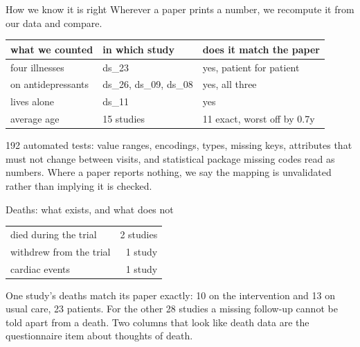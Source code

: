 \documentclass[11pt, t, handout]{beamer}
\newcommand{\ans}[1]{\textcolor{structure.fg}{#1}}
\begin{document}
\begin{frame}{How we know it is right}
  \pause
  Wherever a paper prints a number, we recompute it from our data and compare.
  \vspace{10pt}
  \pause
  \begin{center}\footnotesize
  \begin{tabular}{lll}
    \toprule
    what we counted & in which study & does it match the paper \\
    \midrule
    four illnesses & ds\_23 & \ans{yes, patient for patient} \\
    on antidepressants & ds\_26, ds\_09, ds\_08 & \ans{yes, all three} \\
    lives alone & ds\_11 & \ans{yes} \\
    average age & 15 studies & 11 exact, worst off by 0.7y \\
    \bottomrule
  \end{tabular}
  \end{center}
  \vspace{10pt}
  \pause
  \ans{192 automated tests}: value ranges, encodings, types, missing keys,
  attributes that must not change between visits, and statistical package
  missing codes read as numbers.
  \vspace{6pt}
  \pause
  {\footnotesize Where a paper reports nothing, we say the mapping is
   unvalidated rather than implying it is checked.}
\end{frame}

\begin{frame}{Deaths: what exists, and what does not}
  \pause
  \begin{center}\footnotesize
  \begin{tabular}{lr}
    \toprule
    died during the trial & 2 studies \\
    withdrew from the trial & 1 study \\
    cardiac events & 1 study \\
    \bottomrule
  \end{tabular}
  \end{center}
  \vspace{10pt}
  \pause
  One study's deaths match its paper exactly: \ans{10 on the intervention and
  13 on usual care, 23 patients}.
  \vspace{10pt}
  \pause
  For the other \ans{28 studies a missing follow-up cannot be told apart from a
  death}. Two columns that look like death data are the questionnaire item
  about thoughts of death.
\end{frame}
\end{document}
